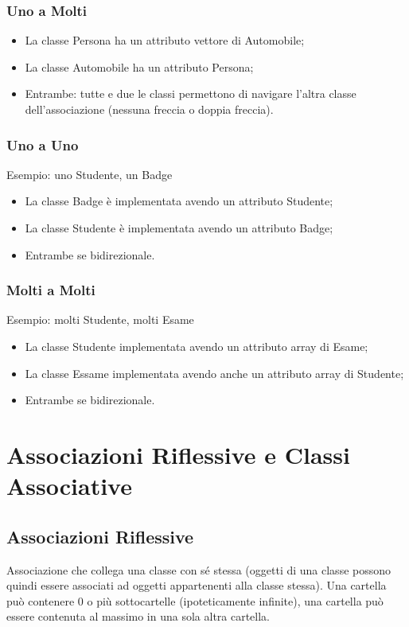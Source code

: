 \documentclass{article}
\begin{document}
      \subsubsection{Uno a Molti}
        \begin{itemize}
          Esempio: una Persona, molte Automobile
          \item La classe Persona ha un attributo vettore di Automobile;
          \item La classe Automobile ha un attributo Persona;
          \item Entrambe: tutte e due le classi permettono di navigare l'altra classe dell'associazione (nessuna freccia o doppia freccia).  
        \end{itemize}
      \subsubsection{Uno a Uno}
        Esempio: uno Studente, un Badge
        \begin{itemize}
          \item La classe Badge è implementata avendo un attributo Studente;
          \item La classe Studente è implementata avendo un attributo Badge;
          \item Entrambe se bidirezionale.
        \end{itemize}
      \subsubsection{Molti a Molti}
        Esempio: molti Studente, molti Esame
        \begin{itemize}
          \item La classe Studente implementata avendo un attributo array di Esame;
          \item La classe Essame implementata avendo anche un attributo array di Studente;
          \item Entrambe se bidirezionale.
        \end{itemize}
  \section{Associazioni Riflessive e Classi Associative}
    \subsection{Associazioni Riflessive}
      Associazione che collega una classe con sé stessa (oggetti di una classe possono quindi essere associati ad oggetti appartenenti alla classe stessa). Una cartella può contenere 0 o più sottocartelle (ipoteticamente infinite), una cartella può essere contenuta al massimo in una sola altra cartella.
\end{document}
